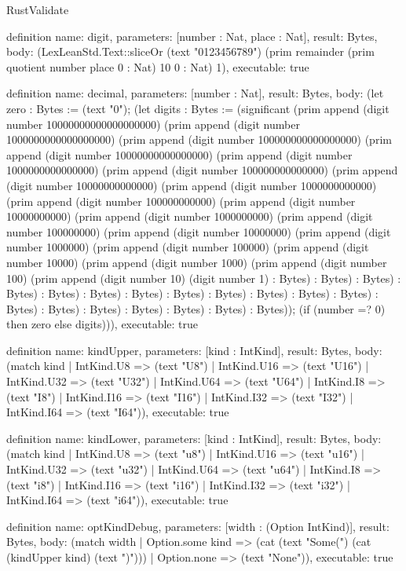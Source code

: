\begin{lexlean}{RustValidate}
\begin{semanticmodule}
definition{
  name: digit,
  parameters: [number : Nat, place : Nat],
  result: Bytes,
  body: (LexLeanStd.Text::sliceOr (text "0123456789") (prim remainder (prim quotient number place 0 : Nat) 10 0 : Nat) 1),
  executable: true
}

definition{
  name: decimal,
  parameters: [number : Nat],
  result: Bytes,
  body: (let zero : Bytes := (text "0"); (let digits : Bytes := (significant (prim append (digit number 10000000000000000000) (prim append (digit number 1000000000000000000) (prim append (digit number 100000000000000000) (prim append (digit number 10000000000000000) (prim append (digit number 1000000000000000) (prim append (digit number 100000000000000) (prim append (digit number 10000000000000) (prim append (digit number 1000000000000) (prim append (digit number 100000000000) (prim append (digit number 10000000000) (prim append (digit number 1000000000) (prim append (digit number 100000000) (prim append (digit number 10000000) (prim append (digit number 1000000) (prim append (digit number 100000) (prim append (digit number 10000) (prim append (digit number 1000) (prim append (digit number 100) (prim append (digit number 10) (digit number 1) : Bytes) : Bytes) : Bytes) : Bytes) : Bytes) : Bytes) : Bytes) : Bytes) : Bytes) : Bytes) : Bytes) : Bytes) : Bytes) : Bytes) : Bytes) : Bytes) : Bytes) : Bytes) : Bytes)); (if (number =? 0) then zero else digits))),
  executable: true
}

definition{
  name: kindUpper,
  parameters: [kind : IntKind],
  result: Bytes,
  body: (match kind
    | IntKind.U8 => (text "U8")
    | IntKind.U16 => (text "U16")
    | IntKind.U32 => (text "U32")
    | IntKind.U64 => (text "U64")
    | IntKind.I8 => (text "I8")
    | IntKind.I16 => (text "I16")
    | IntKind.I32 => (text "I32")
    | IntKind.I64 => (text "I64")),
  executable: true
}

definition{
  name: kindLower,
  parameters: [kind : IntKind],
  result: Bytes,
  body: (match kind
    | IntKind.U8 => (text "u8")
    | IntKind.U16 => (text "u16")
    | IntKind.U32 => (text "u32")
    | IntKind.U64 => (text "u64")
    | IntKind.I8 => (text "i8")
    | IntKind.I16 => (text "i16")
    | IntKind.I32 => (text "i32")
    | IntKind.I64 => (text "i64")),
  executable: true
}

definition{
  name: optKindDebug,
  parameters: [width : (Option IntKind)],
  result: Bytes,
  body: (match width
    | Option.some kind => (cat (text "Some(") (cat (kindUpper kind) (text ")")))
    | Option.none => (text "None")),
  executable: true
}


\end{semanticmodule}
\end{lexlean}
